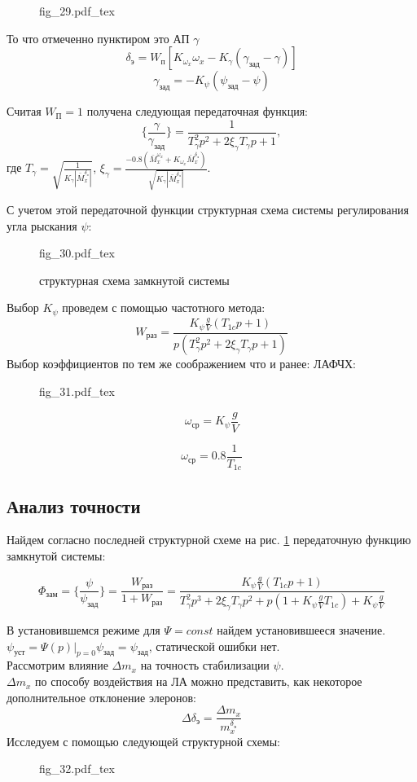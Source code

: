 \documentclass{article}
\begin{document}
\begin{figure}[H]
	\centering
	{fig_29.pdf_tex}
\end{figure}

То что отмеченно пунктиром это АП $\gamma$
\[
	\delta_\text{э} = W_\text{п}[K_{\omega_x}\omega_x - K_{\gamma}(\gamma_\text{зад} - \gamma)]
\]
\[
	\gamma_\text{зад} = -K_{\psi}(\psi_\text{зад} - \psi)
\]

Считая $W_\text{П} = 1$ получена следующая передаточная функция:
\[
	\{\frac{\gamma}{\gamma_\text{зад}} \}=\frac{1}{T_{\gamma}^2 p^2 + 2 \xi_{\gamma} T_\gamma p + 1},
\]
где $T_{\gamma} = \sqrt{\frac{1}{K_{\gamma}|\bar{M}_x^{\delta_\text{э}}|}}$, $\xi_{\gamma} =\frac{-0.8(\bar{M}_x^{\omega_x} + K_{\omega_x} \bar{M}_x^{\delta_\text{э}})}{\sqrt{K_\gamma |\bar{M}_x^{\delta_\text{э}}|}}$.

С учетом этой передаточной функции структурная схема системы регулирования угла рыскания $\psi$:

\begin{figure}[h]
	\centering
	{fig_30.pdf_tex}
	\caption{структурная схема замкнутой системы}
	\label{fig:zam30}
\end{figure}

Выбор $K_{\psi}$ проведем с помощью частотного метода:
\[
	W_\text{раз} = \frac{K_{\psi} \frac{g}{V} (T_{1c}p + 1)}{p(T_{\gamma}^2 p^2 + 2 \xi_\gamma T_\gamma p + 1)}
\]
Выбор коэффициентов по тем же соображением что и ранее:
ЛАФЧХ:
\begin{figure}[H]
	\centering
	{fig_31.pdf_tex}
\end{figure}

\[
	\omega_\text{ср} = K_{\psi}\frac{g}{V}
\]

\[
	\omega_\text{ср} = 0.8\frac{1}{T_{1c}}
\]

\subsection{Анализ точности}
Найдем согласно последней структурной схеме на рис. \ref{fig:zam30} передаточную функцию замкнутой системы:

\[
	\Phi_\text{зам} = \{\frac{\psi}{\psi_\text{зад}} \} = \frac{W_\text{раз}}{1 + W_\text{раз}} = \frac{K_{\psi}\frac{g}{V}(T_{1c}p + 1)}{T_{\gamma}^2 p^3 + 2\xi_\gamma T_\gamma p^2 + p(1 + K_{\psi}\frac{g}{V} T_{1c}) + K_{\psi}\frac{g}{V}}
\]

В установившемся режиме для $\Psi = const$ найдем установившееся значение.\\
$\psi_\text{уст} = \Psi(p) |_{p=0}  \psi _\text{зад}= \psi_\text{зад}$, статической ошибки нет.\\
Рассмотрим влияние $\Delta m_x$ на точность стабилизации $\psi$.\\
$\Delta m_x$ по способу воздействия на ЛА можно представить, как некоторое дополнительное отклонение элеронов:
\[
	\Delta \delta_\text{э} =\frac{\Delta m_x}{m_x^{\delta_\text{э}}} 
\]
Исследуем с помощью следующей структурной схемы:
\begin{figure}[H]
	\centering
	{fig_32.pdf_tex}
\end{figure}
\end{document}
